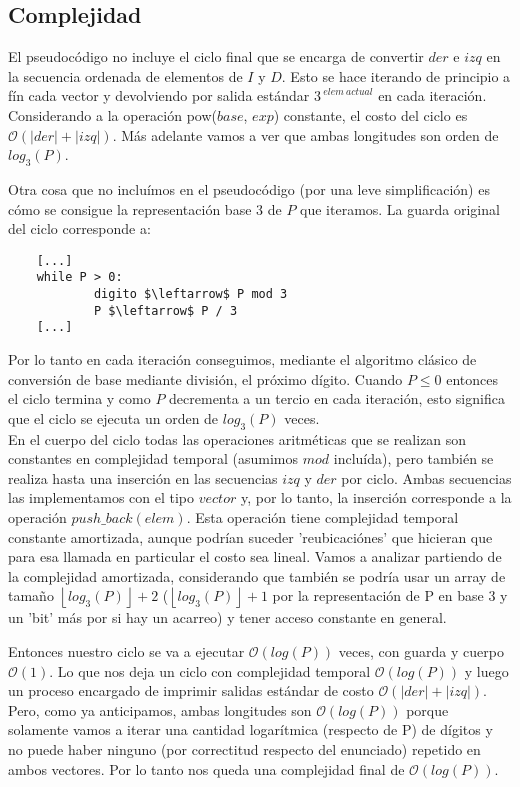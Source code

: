 \newpage
\subsection{Complejidad}
	El pseudocódigo no incluye el ciclo final que se encarga de convertir $der$ e $izq$ en la secuencia ordenada de elementos de $I$ y $D$. Esto se hace iterando de principio a fín cada vector y devolviendo por salida estándar $3^{\ elem \ actual}$ en cada iteración. Considerando a la operación pow($base$, $exp$) constante, el costo del ciclo es $\mathcal{O} (|der| + |izq|)$. Más adelante vamos a ver que ambas longitudes son orden de $log_3(P)$.
	
	Otra cosa que no incluímos en el pseudocódigo (por una leve simplificación) es cómo se consigue la representación base 3 de $P$ que iteramos. La guarda original del ciclo corresponde a:
	
	\begin{lstlisting}
	[...]
	while P > 0:
        	digito $\leftarrow$ P mod 3
        	P $\leftarrow$ P / 3
	[...]
	\end{lstlisting}
	
	Por lo tanto en cada iteración conseguimos, mediante el algoritmo clásico de conversión de base mediante división, el próximo dígito. Cuando $P \leq 0$ entonces el ciclo termina y como $P$ decrementa a un tercio en cada iteración, esto significa que el ciclo se ejecuta un orden de $log_3(P)$ veces. 
	\\
	
	En el cuerpo del ciclo todas las operaciones aritméticas que se realizan son constantes en complejidad temporal (asumimos $mod$ incluída), pero también se realiza hasta una inserción en las secuencias $izq$ y $der$ por ciclo. Ambas secuencias las implementamos con el tipo $vector$ y, por lo tanto, la inserción corresponde a la operación $push\_back(elem)$. Esta operación tiene complejidad temporal constante amortizada, aunque podrían suceder 'reubicaciónes' que hicieran que para esa llamada en particular el costo sea lineal. Vamos a analizar partiendo de la complejidad amortizada, considerando que también se podría usar un array de tamaño $\left \lfloor{log_3(P)}\right \rfloor + 2$ ($\left \lfloor{log_3(P)}\right \rfloor + 1$ por la representación de P en base 3 y un 'bit' más por si hay un acarreo) y tener acceso constante en general.
	
	Entonces nuestro ciclo se va a ejecutar $\mathcal{O} (log(P))$ veces, con guarda y cuerpo $\mathcal{O} (1)$. Lo que nos deja un ciclo con complejidad temporal $\mathcal{O} (log(P))$ y luego un proceso encargado de imprimir salidas estándar de costo $\mathcal{O} (|der| + |izq|)$. Pero, como ya anticipamos, ambas longitudes son $\mathcal{O} (log(P))$ porque solamente vamos a iterar una cantidad logarítmica (respecto de P) de dígitos y no puede haber ninguno (por correctitud respecto del enunciado) repetido en ambos vectores. Por lo tanto nos queda una complejidad final de $\mathcal{O} (log(P))$.
	\\
	
